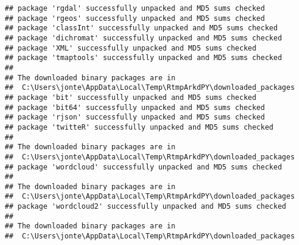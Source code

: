 \documentclass[]{article}
\newenvironment{Shaded}{\begin{snugshade}}{\end{snugshade}}
\newcommand{\KeywordTok}[1]{\textcolor[rgb]{0.13,0.29,0.53}{\textbf{#1}}}
\newcommand{\StringTok}[1]{\textcolor[rgb]{0.31,0.60,0.02}{#1}}
\newcommand{\CommentTok}[1]{\textcolor[rgb]{0.56,0.35,0.01}{\textit{#1}}}
\newcommand{\OperatorTok}[1]{\textcolor[rgb]{0.81,0.36,0.00}{\textbf{#1}}}
\newcommand{\NormalTok}[1]{#1}
\begin{document}
\begin{verbatim}
## package 'rgdal' successfully unpacked and MD5 sums checked
## package 'rgeos' successfully unpacked and MD5 sums checked
## package 'classInt' successfully unpacked and MD5 sums checked
## package 'dichromat' successfully unpacked and MD5 sums checked
## package 'XML' successfully unpacked and MD5 sums checked
## package 'tmaptools' successfully unpacked and MD5 sums checked
## 
## The downloaded binary packages are in
##  C:\Users\jonte\AppData\Local\Temp\RtmpArkdPY\downloaded_packages
## package 'bit' successfully unpacked and MD5 sums checked
## package 'bit64' successfully unpacked and MD5 sums checked
## package 'rjson' successfully unpacked and MD5 sums checked
## package 'twitteR' successfully unpacked and MD5 sums checked
## 
## The downloaded binary packages are in
##  C:\Users\jonte\AppData\Local\Temp\RtmpArkdPY\downloaded_packages
## package 'wordcloud' successfully unpacked and MD5 sums checked
## 
## The downloaded binary packages are in
##  C:\Users\jonte\AppData\Local\Temp\RtmpArkdPY\downloaded_packages
## package 'wordcloud2' successfully unpacked and MD5 sums checked
## 
## The downloaded binary packages are in
##  C:\Users\jonte\AppData\Local\Temp\RtmpArkdPY\downloaded_packages
\end{verbatim}

\begin{Shaded}
\end{Shaded}
\end{document}
